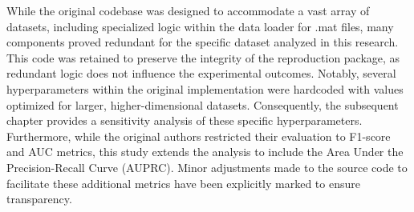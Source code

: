 While the original codebase was designed to accommodate a vast array of datasets, including specialized logic within the data loader for .mat files, many components proved redundant for the specific dataset analyzed in this research. 
This code was retained to preserve the integrity of the reproduction package, as redundant logic does not influence the experimental outcomes. 
Notably, several hyperparameters within the original implementation were hardcoded with values optimized for larger, higher-dimensional datasets. 
Consequently, the subsequent chapter provides a sensitivity analysis of these specific hyperparameters.
Furthermore, while the original authors restricted their evaluation to F1-score and AUC metrics, this study extends the analysis to include the Area Under the Precision-Recall Curve (AUPRC). 
Minor adjustments made to the source code to facilitate these additional metrics have been explicitly marked to ensure transparency.













